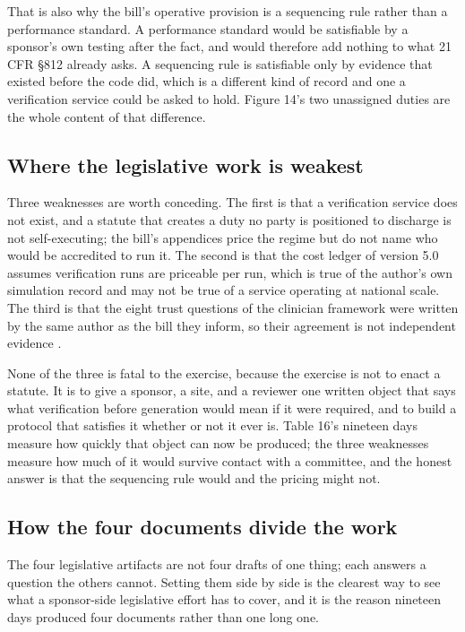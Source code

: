 That is also why the bill's operative provision is a sequencing rule rather than
a performance standard. A performance standard would be satisfiable by a
sponsor's own testing after the fact, and would therefore add nothing to what 21
CFR \S 812 already asks. A sequencing rule is satisfiable only by evidence that
existed before the code did, which is a different kind of record and one a
verification service could be asked to hold. Figure 14's two unassigned duties
are the whole content of that difference.

\subsection{Where the legislative work is weakest}

Three weaknesses are worth conceding. The first is that a verification service
does not exist, and a statute that creates a duty no party is positioned to
discharge is not self-executing; the bill's appendices price the regime but do
not name who would be accredited to run it. The second is that the cost ledger
of version 5.0 assumes verification runs are priceable per run, which is true of
the author's own simulation record and may not be true of a service operating at
national scale. The third is that the eight trust questions of the clinician
framework were written by the same author as the bill they inform, so their
agreement is not independent evidence \cite{clintrust, hr9510billv5}.

None of the three is fatal to the exercise, because the exercise is not to enact
a statute. It is to give a sponsor, a site, and a reviewer one written object
that says what verification before generation would mean if it were required,
and to build a protocol that satisfies it whether or not it ever is. Table 16's
nineteen days measure how quickly that object can now be produced; the three
weaknesses measure how much of it would survive contact with a committee, and
the honest answer is that the sequencing rule would and the pricing might not.

\subsection{How the four documents divide the work}

The four legislative artifacts are not four drafts of one thing; each answers a
question the others cannot. Setting them side by side is the clearest way to see
what a sponsor-side legislative effort has to cover, and it is the reason
nineteen days produced four documents rather than one long one.

